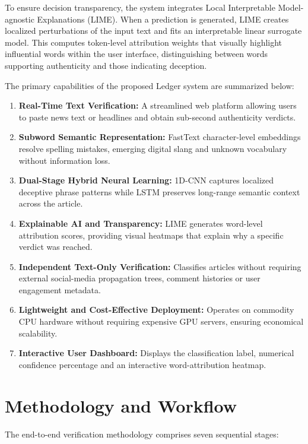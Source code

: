 \documentclass[12pt,a4paper,oneside]{report}
\begin{document}
To ensure decision transparency, the system integrates Local Interpretable Model-agnostic
Explanations (LIME). When a prediction is generated, LIME creates localized perturbations of the
input text and fits an interpretable linear surrogate model. This computes token-level attribution
weights that visually highlight influential words within the user interface, distinguishing between
words supporting authenticity and those indicating deception.

The primary capabilities of the proposed Ledger system are summarized below:

\begin{enumerate}[label=\arabic*., leftmargin=*, itemsep=2pt]
  \item \textbf{Real-Time Text Verification:} A streamlined web platform allowing users to paste
        news text or headlines and obtain sub-second authenticity verdicts.
  \item \textbf{Subword Semantic Representation:} FastText character-level embeddings resolve
        spelling mistakes, emerging digital slang and unknown vocabulary without information loss.
  \item \textbf{Dual-Stage Hybrid Neural Learning:} 1D-CNN captures localized deceptive phrase
        patterns while LSTM preserves long-range semantic context across the article.
  \item \textbf{Explainable AI and Transparency:} LIME generates word-level attribution scores,
        providing visual heatmaps that explain why a specific verdict was reached.
  \item \textbf{Independent Text-Only Verification:} Classifies articles without requiring external
        social-media propagation trees, comment histories or user engagement metadata.
  \item \textbf{Lightweight and Cost-Effective Deployment:} Operates on commodity CPU hardware
        without requiring expensive GPU servers, ensuring economical scalability.
  \item \textbf{Interactive User Dashboard:} Displays the classification label, numerical
        confidence percentage and an interactive word-attribution heatmap.
\end{enumerate}

\section{Methodology and Workflow}

The end-to-end verification methodology comprises seven sequential stages:
\end{document}
